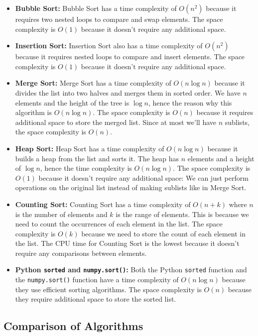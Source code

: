 \documentclass[12pt]{article}
\begin{document}
\begin{itemize}
	\item \textbf{Bubble Sort:} Bubble Sort has a time complexity of $O(n^2)$ because it requires two nested loops to compare and swap elements. The space complexity is $O(1)$ because it doesn't require any additional space.
	\item \textbf{Insertion Sort:} Insertion Sort also has a time complexity of $O(n^2)$ because it requires nested loops to compare and insert elements. The space complexity is $O(1)$ because it doesn't require any additional space.
	\item \textbf{Merge Sort:} Merge Sort has a time complexity of $O(n\log n)$ because it divides the list into two halves and merges them in sorted order. We have $n$ elements and the height of the tree is $\log n$, hence the reason why this algorithm is $O(n\log n)$. The space complexity is $O(n)$ because it requires additional space to store the merged list. Since at most we'll have $n$ sublists, the space complexity is $O(n)$.
	\item \textbf{Heap Sort:} Heap Sort has a time complexity of $O(n\log n)$ because it builds a heap from the list and sorts it. The heap has $n$ elements and a height of $\log n$, hence the time complexity is $O(n\log n)$. The space complexity is $O(1)$ because it doesn't require any additional space: We can just perform operations on the original list instead of making sublists like in Merge Sort.
	\item \textbf{Counting Sort:} Counting Sort has a time complexity of $O(n + k)$ where $n$ is the number of elements and $k$ is the range of elements. This is because we need to count the occurrences of each element in the list. The space complexity is $O(k)$ because we need to store the count of each element in the list. The CPU time for Counting Sort is the lowest because it doesn't require any comparisons between elements.
	\item \textbf{Python \texttt{sorted} and \texttt{numpy.sort()}:} Both the Python \texttt{sorted} function and the \texttt{numpy.sort()} function have a time complexity of $O(n\log n)$ because they use efficient sorting algorithms. The space complexity is $O(n)$ because they require additional space to store the sorted list.
\end{itemize}

\subsection{Comparison of Algorithms}
\end{document}
